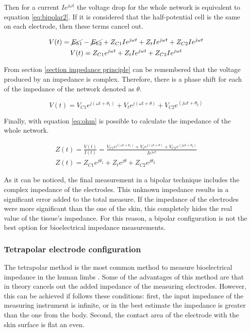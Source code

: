 Then for a current $Ie^{j \omega t}$ the voltage drop for the whole network is equivalent to equation \ref{eq:bipolar2}. If it is considered that the half-potential cell is the same on each electrode, then these terms cancel out. 

\begin{gather}
	\label{eq:bipolar2}
	V(t) = \cancel{E_{h1}} - \cancel{E_{h2}} + Z_{C1}I e^{j \omega t} +Z_t I e^{j \omega t} +Z_{C2}I e^{j \omega t}
	\\
	\label{eq:bipolar3}
	V(t) = Z_{C1}e^{j \omega t} +Z_t I e^{j \omega t} +Z_{C2}I e^{j \omega t}
\end{gather}

From section \ref{section impedance principle} can be remembered that the voltage produced by an impedance is complex. Therefore, there is a phase shift for each of the impedance of the network denoted as $\theta$.

\begin{equation}
	\label{eq:bipolar4}
	V(t) = V_{C1} e^{j(\omega t + \theta_1)} + V_t e^{j( \omega t + \theta)} +V_{C2} e^{(j \omega t + \theta_2)}
\end{equation} 

Finally, with equation \ref{eq:ohm} is possible to calculate the impedance of the whole network.

\begin{gather}
	\label{eq:bipolar5}
	Z(t) =\frac{V(t)}{I(t)} = \frac{V_{C1} e^{j( \omega t + \theta_1)} + V_t e^{j( \omega t + \theta)} +V_{C2} e^{(j \omega t + \theta_2)}}{I e^{j \omega t}} \\
	Z(t) = Z_{C1}e^{j\theta_1} + Z_{t}e^{j\theta} + Z_{C2}e^{j\theta_2}
\end{gather} 

As it can be noticed, the final measurement in a bipolar technique includes the complex impedance of the electrodes. This unknown impedance results in a significant error added to the total measure. If the impedance of the electrodes were more significant than the one of the skin, this completely hides the real value of the tissue's impedance. For this reason, a bipolar configuration is not the best option for bioelectrical impedance measurements. 

\subsubsection{Tetrapolar electrode configuration}
The tetrapolar method is the most common method to measure bioelectrical impedance in the human limbs \cite{costeloe1980continuous, yamakoshi1980limb, nyboer1974blood, yamamoto1992impedance}. Some of the advantages of this method are that in theory cancels out the added impedance of the measuring electrodes. However, this can be achieved if follows these conditions: first, the input impedance of the measuring instrument is infinite, or in the best estimate the impedance is greater than the one from the body. Second, the contact area of the electrode with the skin surface is flat an even.

